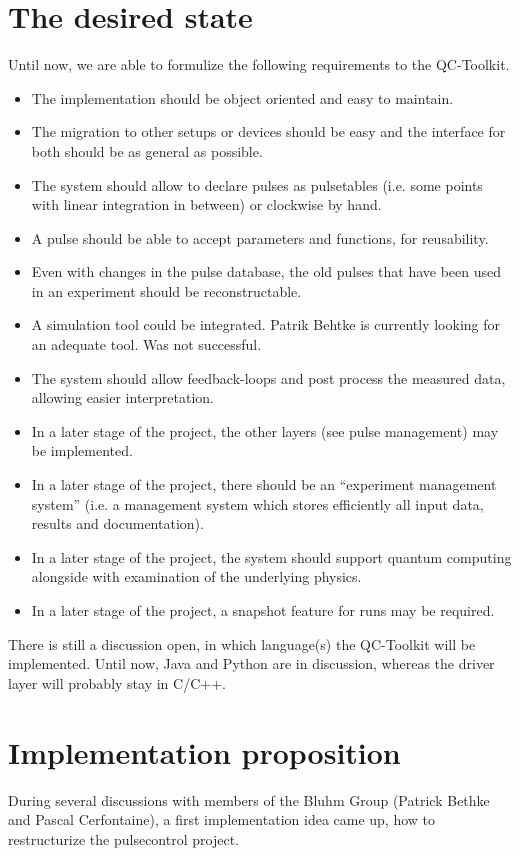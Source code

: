 \documentclass[a4paper,12pt]{article}
\begin{document}
\section{The desired state}
Until now, we are able to formulize the following requirements to the QC-Toolkit.
\begin{itemize} \itemsep-0.5pt
 \item The implementation should be object oriented and easy to maintain.
 \item The migration to other setups or devices should be easy and the interface for both should be as general as possible.
 \item The system should allow to declare pulses as pulsetables (i.e. some points with linear integration in between) or clockwise by hand.
 \item A pulse should be able to accept parameters and functions, for reusability.
 \item Even with changes in the pulse database, the old pulses that have been used in an experiment should be reconstructable.
 \item A simulation tool could be integrated. Patrik Behtke is currently looking for an adequate tool. Was not successful.
 \item The system should allow feedback-loops and post process the measured data, allowing easier interpretation.
 \item In a later stage of the project, the other layers (see pulse management) may be implemented.
 \item In a later stage of the project, there should be an ``experiment management system'' (i.e. a management system which stores efficiently all input data, results and documentation).
 \item In a later stage of the project, the system should support quantum computing alongside with examination of the underlying physics.
 \item In a later stage of the project, a snapshot feature for runs may be required.
 
\end{itemize}

There is still a discussion open, in which language(s) the QC-Toolkit will be implemented. Until now, Java and Python are in discussion, whereas the driver layer will probably stay in C/C++.

\section{Implementation proposition}
During several discussions with members of the Bluhm Group (Patrick Bethke and Pascal Cerfontaine), a first implementation idea came up, how to restructurize the pulsecontrol project.  
\end{document}
